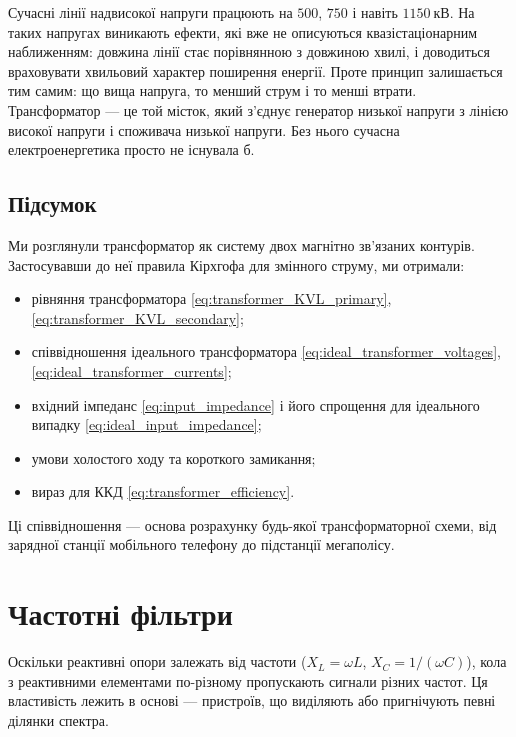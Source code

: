 \begin{Attention}
	Сучасні лінії надвисокої напруги працюють на $500$,
	$750$ і навіть $1150\ \text{кВ}$. На таких напругах
	виникають ефекти, які вже не описуються квазістаціонарним
	наближенням: довжина лінії стає порівнянною з довжиною
	хвилі, і доводиться враховувати хвильовий характер
	поширення енергії. Проте принцип залишається тим самим:
	що вища напруга, то менший струм і то менші втрати.
	Трансформатор --- це той місток, який з'єднує генератор
	низької напруги з лінією високої напруги і споживача
	низької напруги. Без нього сучасна електроенергетика
	просто не існувала б.
\end{Attention}

\subsection*{Підсумок}

Ми розглянули трансформатор як систему двох магнітно
зв'язаних контурів. Застосувавши до неї правила Кірхгофа для
змінного струму, ми отримали:
\begin{itemize}
	\item рівняння трансформатора \eqref{eq:transformer_KVL_primary},
	\eqref{eq:transformer_KVL_secondary};
	\item співвідношення ідеального трансформатора
	\eqref{eq:ideal_transformer_voltages},
	\eqref{eq:ideal_transformer_currents};
	\item вхідний імпеданс \eqref{eq:input_impedance} і його
	спрощення для ідеального випадку
	\eqref{eq:ideal_input_impedance};
	\item умови холостого ходу та короткого замикання;
	\item вираз для ККД \eqref{eq:transformer_efficiency}.
\end{itemize}
Ці співвідношення --- основа розрахунку будь-якої
трансформаторної схеми, від зарядної станції мобільного
телефону до підстанції мегаполісу.

\section{Частотні фільтри}

Оскільки реактивні опори залежать від частоти ($X_L = \omega L$, $X_C = 1/(\omega C)$), кола з реактивними елементами по-різному пропускають сигнали різних частот. Ця властивість лежить в основі  --- пристроїв, що виділяють або пригнічують певні ділянки спектра.

